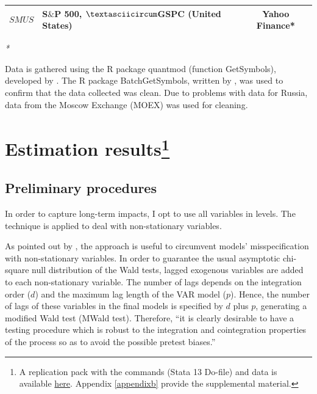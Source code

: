 \documentclass[a4paper, twoside]{templates/ociamthesis}
\begin{document}
\begin{table}[ht]
{\begin{threeparttable}
\begin{tabular}[t]{c>{\raggedright\arraybackslash}p{}c}
$SMUS$ & S$\&$P 500, $\textasciicircum$GSPC (United States) & Yahoo Finance*\\
\bottomrule
\end{tabular}
\begin{tablenotes}[para]
\item \textit{\footnotesize{*}} 
\item \footnotesize{Data is gathered using the R package {quantmod} (function GetSymbols), developed by \textcite{fong2013}. The R package {BatchGetSymbols}, written by \textcite{ryan2020}, was used to confirm that the data collected was clean. Due to problems with data for Russia, data from the Moscow Exchange (MOEX) was used for cleaning.}
\end{tablenotes}
\end{threeparttable}}
\end{table}

\hypertarget{threethree}{%
\section[Estimation results]{\texorpdfstring{Estimation results\footnote{A replication pack with the commands (Stata 13 Do-file) and data is available \href{http://www.accessecon.com/includes/CountdownloadPDF.aspx?Type=Other_data\&ID=EB-19-00720}{here}. Appendix \ref{appendixb} provide the supplemental material.}}{Estimation results}}\label{threethree}}

\hypertarget{threethreeone}{%
\subsection{Preliminary procedures}\label{threethreeone}}

In order to capture long-term impacts, I opt to use all variables in levels. The \textcite{toda1995} technique is applied to deal with non-stationary variables.

As pointed out by \textcite{amiri2012}, the \textcite{toda1995} approach is useful to circumvent models' misspecification with non-stationary variables. In order to guarantee the usual asymptotic chi-square null distribution of the Wald tests, lagged exogenous variables are added to each non-stationary variable. The number of lags depends on the integration order (\(d\)) and the maximum lag length of the VAR model (\(p\)). Hence, the number of lags of these variables in the final models is specified by \(d\) plus \(p\), generating a modified Wald test (MWald test). Therefore, ``it is clearly desirable to have a testing procedure which is robust to the integration and cointegration properties of the process so as to avoid the possible pretest biases.'' \autocite[ 226]{toda1995}
\end{document}
